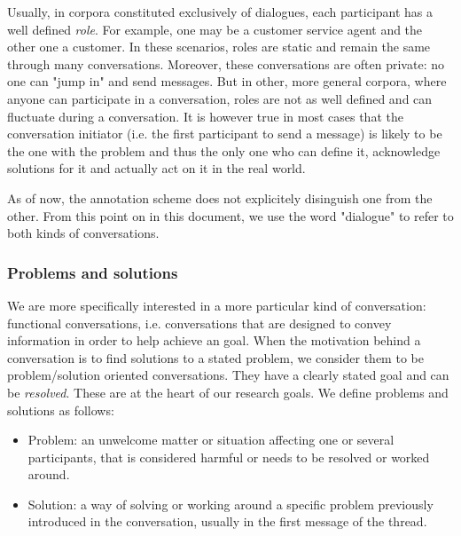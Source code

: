 Usually, in corpora constituted exclusively of dialogues, each participant has a well defined \textit{role}. For example, one may be a customer service agent and the other one a customer. In these scenarios, roles are static and remain the same through many conversations. Moreover, these conversations are often private: no one can "jump in" and send messages. But in other, more general corpora, where anyone can participate in a conversation, roles are not as well defined and can fluctuate during a conversation. It is however true in most cases that the conversation initiator (i.e. the first participant to send a message) is likely to be the one with the problem and thus the only one who can define it, acknowledge solutions for it and actually act on it in the real world.

As of now, the annotation scheme does not explicitely disinguish one from the other. From this point on in this document, we use the word "dialogue" to refer to both kinds of conversations.

\subsubsection{Problems and solutions}

We are more specifically interested in a more particular kind of conversation: functional conversations, i.e. conversations that are designed to convey information in order to help achieve an goal. When the motivation behind a conversation is to find solutions to a stated problem, we consider them to be problem/solution oriented conversations. They have a clearly stated goal and can be \textit{resolved}. These are at the heart of our research goals.
\newline
\newline
We define problems and solutions as follows:

\begin{itemize}
	\item Problem: an unwelcome matter or situation affecting one or several participants, that is considered harmful or needs to be resolved or worked around.
	\item Solution: a way of solving or working around a specific problem previously introduced in the conversation, usually in the first message of the thread.
\end{itemize}